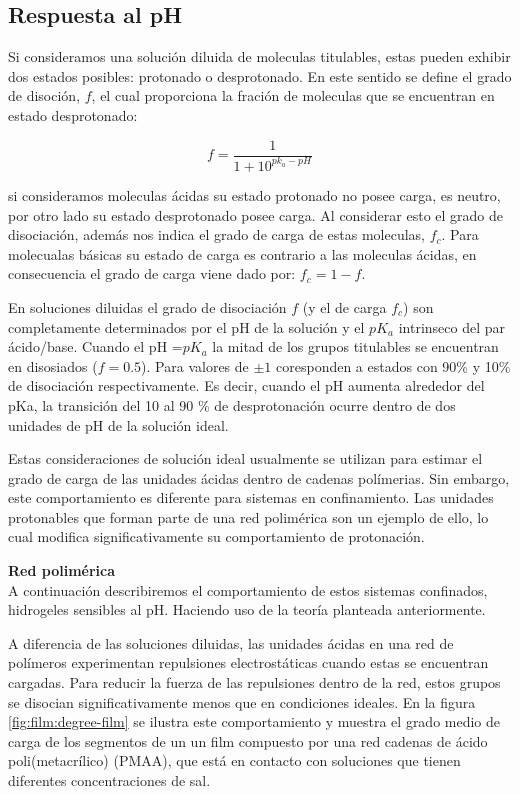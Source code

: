 \subsection{Respuesta al pH}

Si consideramos una soluci\'on diluida de moleculas titulables, estas pueden exhibir dos estados posibles: protonado o desprotonado. En este sentido se define el grado de disoción, $f$, el cual  proporciona la fraci\'on de moleculas que se encuentran en estado desprotonado:


\begin{equation}
    f = \frac{1}{1+10^{pk_a -pH}}
    \label{eq:diso}
\end{equation}

si consideramos moleculas \'acidas su estado protonado no posee carga, es  neutro, por otro lado su estado desprotonado posee carga. 
Al considerar esto el grado de disociaci\'on, adem\'as nos indica el grado de carga de estas moleculas, $f_c$.
Para molecualas b\'asicas su estado de carga es contrario a las moleculas \'acidas, en consecuencia el grado de carga viene dado por: $f_c =1- f$.

En soluciones diluidas el grado de disociaci\'on $f$ (y el de carga $f_c$) son completamente determinados por el pH de la soluci\'on y el $pK_a$ intrinseco del par \'acido/base. 
Cuando el pH =$pK_a$ la mitad de los grupos titulables se encuentran en disosiados ($f = 0.5$). Para valores de $\pm 1$ coresponden a estados con 90\% y 10\% de disociaci\'on respectivamente.
Es decir, cuando el pH aumenta alrededor del pKa, la transici\'on del 10 al 90 \% de desprotonaci\'on ocurre dentro de dos unidades de pH de la soluci\'on ideal. 

Estas consideraciones de soluci\'on ideal usualmente se utilizan para estimar el grado de carga de las unidades \'acidas dentro de cadenas pol\'imerias. Sin embargo, este comportamiento es diferente para sistemas  en confinamiento. Las unidades  protonables que forman parte de una red polim\'erica son un ejemplo de ello, lo cual modifica significativamente su comportamiento de protonaci\'on.


\textbf{Red polim\'erica} \\

A continuaci\'on describiremos el comportamiento de estos sistemas confinados, hidrogeles sensibles al pH. 
Haciendo uso de la teor\'ia planteada anteriormente. 

A diferencia de las soluciones diluidas, las unidades \'acidas en una red de pol\'imeros experimentan repulsiones electrost\'aticas cuando estas se encuentran cargadas. Para reducir la fuerza de las repulsiones dentro de la red, estos grupos se disocian significativamente menos que en condiciones ideales. En la figura \ref{fig:film:degree-film} se ilustra este comportamiento y muestra el grado medio de carga de los segmentos de un un film compuesto por una red cadenas de \'acido poli(metacr\'ilico) (PMAA), que est\'a en contacto con soluciones que tienen diferentes concentraciones de sal.


